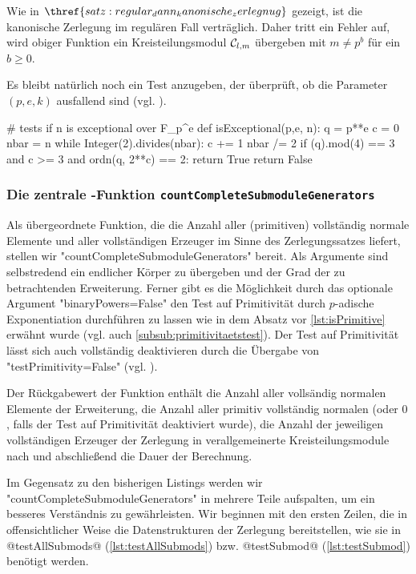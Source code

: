 Wie in $\thref{satz:regular_dann_kanonische_zerlegnug}$ gezeigt, ist die
kanonische Zerlegung im regulären Fall verträglich. Daher tritt ein Fehler auf,
wird obiger Funktion ein Kreisteilungsmodul $\mathcal{C}_{l,m}$ übergeben mit 
$m \neq p^b$ für ein $b\geq 0$.

Es bleibt natürlich noch ein Test anzugeben, der überprüft, ob 
die Parameter $(p,e,k)$ ausfallend sind (vgl. ).

\begin{sagecode}[caption={Aus \url{../Sage/enumeratePCNs.spyx}},
  firstnumber=452]
# tests if n is exceptional over F_p^e
def isExceptional(p,e, n):
    q = p**e
    c = 0
    nbar = n
    while Integer(2).divides(nbar):
        c += 1
        nbar /= 2
    if (q).mod(4) == 3  and c >= 3  and ordn(q, 2**c) == 2:
        return True
    return False
\end{sagecode}  


\subsubsection{Die zentrale \sage-Funktion 
  \texttt{countCompleteSubmoduleGenerators}}

Als übergeordnete Funktion, die die Anzahl aller (primitiven) vollständig
normale Elemente und aller vollständigen Erzeuger im Sinne des Zerlegungssatzes
liefert, stellen wir "countCompleteSubmoduleGenerators" bereit. Als Argumente
sind selbstredend ein endlicher Körper zu übergeben und der Grad der zu
betrachtenden Erweiterung. Ferner gibt es die Möglichkeit durch das optionale
Argument "binaryPowers=False" den Test auf Primitivität durch $p$-adische
Exponentiation durchführen zu lassen wie in dem Absatz vor 
\autoref{lst:isPrimitive} erwähnt wurde (vgl. auch 
\autoref{subsub:primitivitaetstest}). Der Test auf Primitivität lässt sich auch
vollständig deaktivieren durch die Übergabe von "testPrimitivity=False"
(vgl. ).

Der Rückgabewert der Funktion enthält die Anzahl aller vollsändig normalen
Elemente der Erweiterung, die Anzahl aller primitiv vollständig normalen (oder
$0$, falls der Test auf Primitivität deaktiviert wurde), 
die Anzahl der jeweiligen vollständigen Erzeuger der Zerlegung in
verallgemeinerte Kreisteilungsmodule nach  und
abschließend die Dauer der Berechnung.

Im Gegensatz zu den bisherigen Listings werden wir
"countCompleteSubmoduleGenerators" in mehrere Teile aufspalten, um ein besseres
Verständnis zu gewährleisten. Wir beginnen mit den ersten Zeilen, die in
offensichtlicher Weise die Datenstrukturen der Zerlegung bereitstellen, wie sie
in @testAllSubmods@ (\autoref{lst:testAllSubmods}) bzw. @testSubmod@ 
(\autoref{lst:testSubmod}) benötigt werden.


